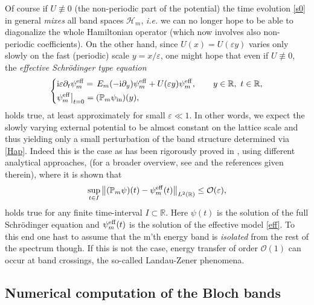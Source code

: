 \documentclass[leqno,final]{siamltex}
\numberwithin{equation}{section}
\newcounter{me}
\begin{document}
Of course if $U \not \equiv 0$ (the non-periodic part of the
potential) the time evolution \eqref{s0} in general \emph{mixes}
all band spaces $\mathcal H_m$, {{\sl i.e.\/ }} we can no longer hope to be
able to diagonalize the whole Hamiltonian operator (which now
involves also non-periodic coefficients). On the other hand, since
$U(x) = U({{\varepsilon }} y)$ varies only slowly on the fast (periodic) scale
$y = x/{{\varepsilon }}$, one might hope that even if $U\not \equiv 0$, the
\emph{effective Schr\"odinger type equation}
\begin{equation}\label{eff}
\left \{
\begin{aligned}
& {\mathrm{i}} {{\varepsilon }} \partial_t \psi^{\rm eff}_m = \, E_m(-{\mathrm{i}} \partial_y)
\psi^{\rm eff}_m + U({{\varepsilon }} y ) \psi^{\rm eff}_m, \qquad y \in {{\mathbb R}},
\ t\in {{\mathbb R}},\\
& \psi^{\rm eff}_m\big |_{t=0}= (\mathbb P_m \psi_{\rm in})(y),
\end{aligned}
\right.
\end{equation}
holds true, at least approximately for small ${{\varepsilon }}\ll 1$. In other
words, we expect the slowly varying external potential to be
almost constant on the lattice scale and thus yielding only a
small perturbation of the band structure determined via
\eqref{Hap}. Indeed this is the case as has been rigorously proved
in \cite{CMS, GRT, PST}, using different analytical approaches,
(for a broader overview, see \cite{Te} and the references given
therein), where it is shown that \begin{equation} \sup_{t\in I} {\big
\|(\mathbb P_m \psi)(t) - \psi^{\rm eff}_m (t) \big \|}_{{{L}}^2({{\mathbb R}})}
\leq {\mathcal O}({{\varepsilon }}), \end{equation} holds true for any finite time-interval $I\subset
{{\mathbb R}}$. Here $\psi(t)$ is the solution of the full Schr\"odinger
equation and $\psi^{\rm eff}_m(t)$ is the solution of the
effective model \eqref{eff}. To this end one hast to assume that
the m'th energy band is \emph{isolated} from the rest of the
spectrum though. If this is not the case, energy transfer of order
${\mathcal O}(1)$ can occur at band crossings, the so-called Landau-Zener
phenomena.

\subsection{Numerical computation of the Bloch bands}\label{numbands}
\end{document}
